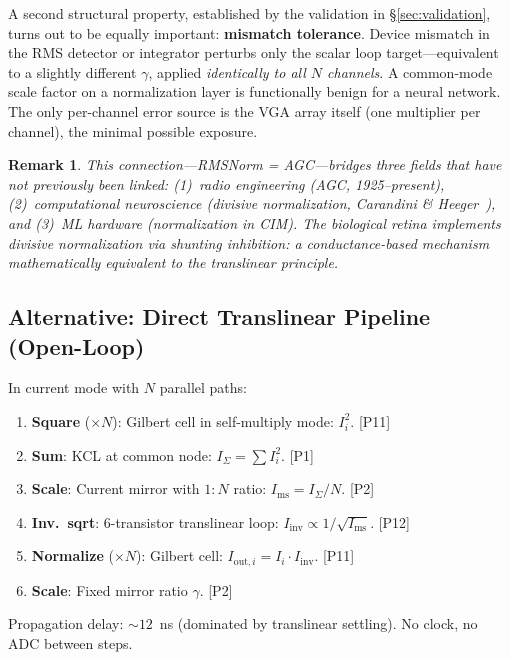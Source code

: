 \documentclass[11pt]{article}
\newtheorem{remark}{Remark}
\begin{document}
A second structural property, established by the validation in \S\ref{sec:validation}, turns out to be equally important: \textbf{mismatch tolerance}. Device mismatch in the RMS detector or integrator perturbs only the scalar loop target---equivalent to a slightly different $\gamma$, applied \textit{identically to all $N$ channels}. A common-mode scale factor on a normalization layer is functionally benign for a neural network. The only per-channel error source is the VGA array itself (one multiplier per channel), the minimal possible exposure.

\begin{remark}
This connection---RMSNorm = AGC---bridges three fields that have not previously been linked: (1)~radio engineering (AGC, 1925--present), (2)~computational neuroscience (divisive normalization, Carandini \& Heeger~\cite{carandini2012}), and (3)~ML hardware (normalization in CIM). The biological retina implements divisive normalization via shunting inhibition: a conductance-based mechanism mathematically equivalent to the translinear principle.
\end{remark}

\subsection{Alternative: Direct Translinear Pipeline (Open-Loop)}
\label{sec:translinear}

In current mode with $N$ parallel paths:

\begin{enumerate}[leftmargin=*]
\item \textbf{Square} ($\times N$): Gilbert cell in self-multiply mode: $I_i^2$. \hfill [P11]
\item \textbf{Sum}: KCL at common node: $I_{\Sigma} = \sum I_i^2$. \hfill [P1]
\item \textbf{Scale}: Current mirror with $1{:}N$ ratio: $I_{\text{ms}} = I_{\Sigma}/N$. \hfill [P2]
\item \textbf{Inv.\ sqrt}: 6-transistor translinear loop: $I_{\text{inv}} \propto 1/\sqrt{I_{\text{ms}}}$. \hfill [P12]
\item \textbf{Normalize} ($\times N$): Gilbert cell: $I_{\text{out},i} = I_i \cdot I_{\text{inv}}$. \hfill [P11]
\item \textbf{Scale}: Fixed mirror ratio $\gamma$. \hfill [P2]
\end{enumerate}

Propagation delay: ${\sim}12$~ns (dominated by translinear settling). No clock, no ADC between steps.
\end{document}
